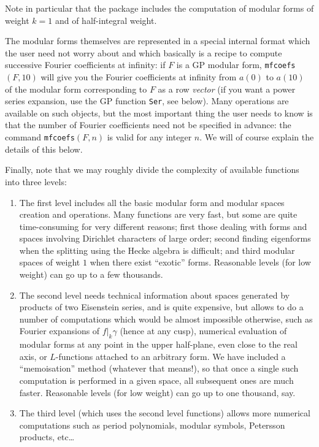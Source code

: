 \documentclass[11pt]{article}
\def\kbd#1{{\tt #1}}
\begin{document}
Note in particular that the package includes the computation of modular
forms of weight $k=1$ and of half-integral weight.

\medskip

The modular forms themselves are represented in a special internal format
which the user need not worry about and which basically is a recipe to
compute successive Fourier coefficients at infinity: if $F$ is a GP modular
form, \kbd{mfcoefs}$(F, 10)$ will give you the Fourier coefficients at infinity
from $a(0)$ to $a(10)$ of the modular form corresponding to $F$ as a row
\emph{vector} (if you want a power series expansion, use the GP function
\kbd{Ser}, see below). Many operations are available on such objects, but the
most important thing the user needs to know is that the number of Fourier
coefficients need not be specified in advance: the command
\kbd{mfcoefs}$(F,n)$ is valid for any integer $n$. We will of course explain
the details of this below.

\medskip

Finally, note that we may roughly divide the complexity of available functions
into three levels:

\begin{enumerate}
\item The first level includes all the basic modular form and modular spaces
creation and operations. Many functions are very fast, but some are quite
time-consuming for very different reasons; first those dealing with forms and
spaces involving Dirichlet characters of large order; second finding eigenforms
when the splitting using the Hecke algebra is difficult; and third modular
spaces of weight $1$ when there exist ``exotic'' forms. Reasonable levels
(for low weight) can go up to a few thousands.
\item The second level needs technical information about spaces generated by
products of two Eisenstein series, and is quite expensive, but allows to do
a number of computations which would be almost impossible otherwise, such as
Fourier expansions of $f|_k\gamma$ (hence at any cusp), numerical
evaluation of modular forms at any point in the upper half-plane, even close
to the real axis, or $L$-functions attached to an arbitrary form. We have
included a ``memoisation'' method (whatever that means!), so that once a single
such computation is performed in a given space, all subsequent ones are
much faster. Reasonable levels (for low weight) can go up to one thousand, say.
\item The third level (which uses the second level functions) allows more
numerical computations such as period polynomials, modular symbols,
Petersson products, etc\dots
\end{enumerate}
\end{document}
